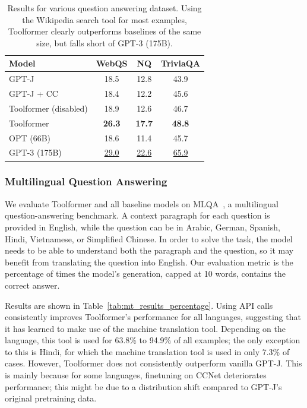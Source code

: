 \documentclass[11pt]{article}
\newcommand{\ours}[0]{Toolformer}
\begin{document}
\begin{CJK*}{UTF8}{gbsn}
\begin{table}
    \centering
    \small
    \setlength{\tabcolsep}{5pt}
    \begin{tabularx}{\linewidth}{Xccc}
        \toprule
        \textbf{Model} & \textbf{WebQS} & \textbf{NQ} & \textbf{TriviaQA}  \\
        \midrule
         GPT-J & 18.5 & 12.8 & 43.9  \\         
         GPT-J + CC  & 18.4 & 12.2 & 45.6  \\        
        \ours{} (disabled)  & 18.9 & 12.6 & 46.7  \\
        \ours{} & \textbf{26.3} & \textbf{17.7} & \textbf{48.8} \\
         \midrule  
         OPT (66B) & 18.6 & 11.4 & 45.7 \\
         GPT-3 (175B) & \underline{29.0} & \underline{22.6} & \underline{65.9} \\
         \bottomrule
    \end{tabularx}
    \caption{Results for various question answering dataset. Using the Wikipedia search tool for most examples, \ours{} clearly outperforms baselines of the same size, but falls short of GPT-3 (175B).}
    \label{tab:qa_results}
\end{table}

\subsubsection{Multilingual Question Answering}
We evaluate \ours{} and all baseline models on MLQA~\citep{lewis2019mlqa}, a multilingual question-answering benchmark. A context paragraph for each question is provided in English, while the question can be in Arabic, German, Spanish, Hindi, Vietnamese, or Simplified Chinese. %
In order to solve the task, the model needs to be able to understand both the paragraph and the question, so it may benefit from translating the question into English. Our evaluation metric is the percentage of times the model's generation, capped at 10 words, contains the correct answer. 

Results are shown in Table~\ref{tab:mt_results_percentage}. Using API calls consistently improves \ours{}'s performance for all languages, suggesting that it has learned to make use of the machine translation tool. Depending on the language, this tool is used for 63.8\% to 94.9\% of all examples; the only exception to this is Hindi, for which the machine translation tool is used in only 7.3\% of cases. However, \ours{} does not consistently outperform vanilla GPT-J. This is mainly because for some languages, finetuning on CCNet deteriorates performance; this might be due to a distribution shift compared to GPT-J's original pretraining data.


\end{CJK*}
\end{document}
